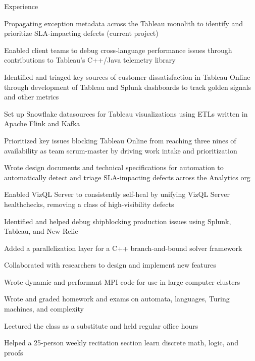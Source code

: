 \documentclass{cv}
\begin{document}

\begin{cvsection}{Experience}
  {
    \item Propagating exception metadata across the Tableau monolith to identify and prioritize SLA-impacting defects (current project)
    \item Enabled client teams to debug cross-language performance issues through contributions to Tableau's C++/Java telemetry library
    \item Identified and triaged key sources of customer dissatisfaction in Tableau Online through development of Tableau and Splunk dashboards to track golden signals and other metrics
    \item Set up Snowflake datasources for Tableau visualizations using ETLs written in Apache Flink and Kafka
    \item Prioritized key issues blocking Tableau Online from reaching three nines of availability as team scrum-master by driving work intake and prioritization
    \item Wrote design documents and technical specifications for automation to automatically detect and triage SLA-impacting defects across the Analytics org
    \item Enabled VizQL Server to consistently self-heal by unifying VizQL Server healthchecks, removing a class of high-visibility defects
    \item Identified and helped debug shipblocking production issues using Splunk, Tableau, and New Relic
  }
  {
    \item Added a parallelization layer for a C++ branch-and-bound solver framework
    \item Collaborated with researchers to design and implement new features
    \item Wrote dynamic and performant MPI code for use in large computer clusters
  }
  {
    \item Wrote and graded homework and exams on automata, languages, Turing machines, and complexity
    \item Lectured the class as a substitute and held regular office hours
  }
  {
    \item Helped a 25-person weekly recitation section learn discrete math, logic, and proofs
  }
\end{cvsection}
\end{document}
